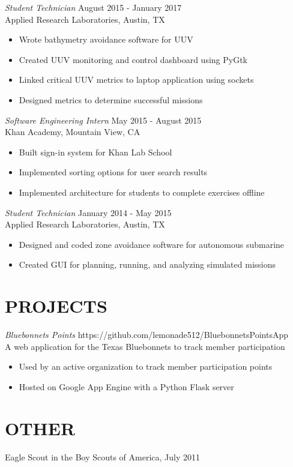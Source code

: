 \documentclass[margin,10pt]{res}
\begin{document}
\begin{resume}
    {\sl Student Technician} \hfill            August 2015 - January 2017 \\
    Applied Research Laboratories, Austin, TX
    \begin{itemize}  \itemsep -2pt %
        \item Wrote bathymetry avoidance software for UUV
        \item Created UUV monitoring and control dashboard using PyGtk
        \item Linked critical UUV metrics to laptop application using sockets
        \item Designed metrics to determine successful missions
    \end{itemize}

    {\sl Software Engineering Intern} \hfill   May 2015 - August 2015 \\
    Khan Academy, Mountain View, CA
    \begin{itemize} \itemsep -2pt %
        \item Built sign-in system for Khan Lab School
        \item Implemented sorting options for user search results
        \item Implemented architecture for students to complete exercises offline
    \end{itemize}

    {\sl Student Technician} \hfill            January 2014 - May 2015 \\
    Applied Research Laboratories, Austin, TX
    \begin{itemize}  \itemsep -2pt %
        \item Designed and coded zone avoidance software for autonomous submarine
        \item Created GUI for planning, running, and analyzing simulated missions
    \end{itemize}

\section{PROJECTS}
    {\sl Bluebonnets Points} \hfill https://github.com/lemonade512/BluebonnetsPointsApp \\
    A web application for the Texas Bluebonnets to track member participation
    \begin{itemize} \itemsep -2pt
        \item Used by an active organization to track member participation points
        \item Hosted on Google App Engine with a Python Flask server
    \end{itemize}

\section{OTHER}
    Eagle Scout in the Boy Scouts of America, July 2011 \\


\end{resume}
\end{document}
